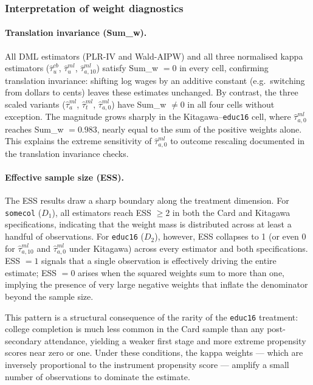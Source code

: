 \documentclass[12pt]{article}
\begin{document}
\subsubsection*{Interpretation of weight diagnostics}

\paragraph{Translation invariance (Sum\_w).}
All DML estimators (PLR-IV and Wald-AIPW) and all three
normalised kappa estimators ($\hat\tau^{cb}_u$,
$\hat\tau^{ml}_u$, $\hat\tau^{ml}_{a,10}$) satisfy
Sum\_w $= 0$ in every cell, confirming translation
invariance: shifting log wages by an additive constant
(e.g.\ switching from dollars to cents) leaves these
estimates unchanged. By contrast, the three scaled
variants ($\hat\tau^{ml}_a$, $\hat\tau^{ml}_t$,
$\hat\tau^{ml}_{a,0}$) have Sum\_w $\neq 0$ in all four
cells without exception. The magnitude grows sharply in
the Kitagawa--\texttt{educ16} cell, where
$\hat\tau^{ml}_{a,0}$ reaches Sum\_w $= 0.983$, nearly
equal to the sum of the positive weights alone. This
explains the extreme sensitivity of $\hat\tau^{ml}_{a,0}$
to outcome rescaling documented in the translation
invariance checks.

\paragraph{Effective sample size (ESS).}
The ESS results draw a sharp boundary along the treatment
dimension. For \texttt{somecol} ($D_1$), all estimators
reach ESS $\geq 2$ in both the Card and Kitagawa
specifications, indicating that the weight mass is
distributed across at least a handful of observations.
For \texttt{educ16} ($D_2$), however, ESS collapses to 1
(or even 0 for $\hat\tau^{ml}_{a,10}$ and
$\hat\tau^{ml}_{a,0}$ under Kitagawa) across every
estimator and both specifications. ESS $= 1$ signals that
a single observation is effectively driving the entire
estimate; ESS $= 0$ arises when the squared weights sum
to more than one, implying the presence of very large
negative weights that inflate the denominator beyond the
sample size.

This pattern is a structural consequence of the rarity
of the \texttt{educ16} treatment: college completion
is much less common in the Card sample than any
post-secondary attendance, yielding a weaker first stage
and more extreme propensity scores near zero or one.
Under these conditions, the kappa weights --- which are
inversely proportional to the instrument propensity score
--- amplify a small number of observations to dominate
the estimate.
\end{document}
